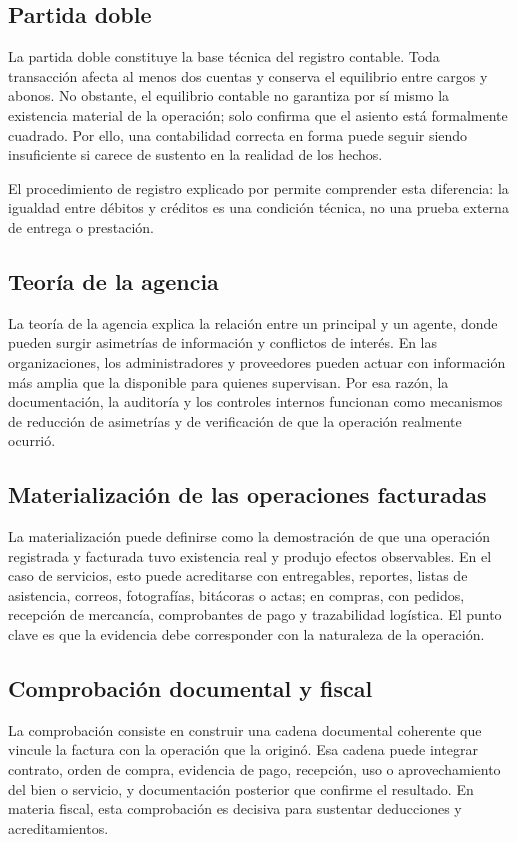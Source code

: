 \documentclass[spanish,12pt,letterpaper,oneside]{article}
\begin{document}
\subsection{Partida doble}
La partida doble constituye la base técnica del registro contable. Toda transacción afecta al menos dos cuentas y conserva el equilibrio entre cargos y abonos. No obstante, el equilibrio contable no garantiza por sí mismo la existencia material de la operación; solo confirma que el asiento está formalmente cuadrado. Por ello, una contabilidad correcta en forma puede seguir siendo insuficiente si carece de sustento en la realidad de los hechos.

El procedimiento de registro explicado por \textcite[cap. 3]{openstax2019} permite comprender esta diferencia: la igualdad entre débitos y créditos es una condición técnica, no una prueba externa de entrega o prestación.

\subsection{Teoría de la agencia}
La teoría de la agencia explica la relación entre un principal y un agente, donde pueden surgir asimetrías de información y conflictos de interés. En las organizaciones, los administradores y proveedores pueden actuar con información más amplia que la disponible para quienes supervisan. Por esa razón, la documentación, la auditoría y los controles internos funcionan como mecanismos de reducción de asimetrías y de verificación de que la operación realmente ocurrió.

\subsection{Materialización de las operaciones facturadas}
La materialización puede definirse como la demostración de que una operación registrada y facturada tuvo existencia real y produjo efectos observables. En el caso de servicios, esto puede acreditarse con entregables, reportes, listas de asistencia, correos, fotografías, bitácoras o actas; en compras, con pedidos, recepción de mercancía, comprobantes de pago y trazabilidad logística. El punto clave es que la evidencia debe corresponder con la naturaleza de la operación.

\subsection{Comprobación documental y fiscal}
La comprobación consiste en construir una cadena documental coherente que vincule la factura con la operación que la originó. Esa cadena puede integrar contrato, orden de compra, evidencia de pago, recepción, uso o aprovechamiento del bien o servicio, y documentación posterior que confirme el resultado. En materia fiscal, esta comprobación es decisiva para sustentar deducciones y acreditamientos.
\end{document}
